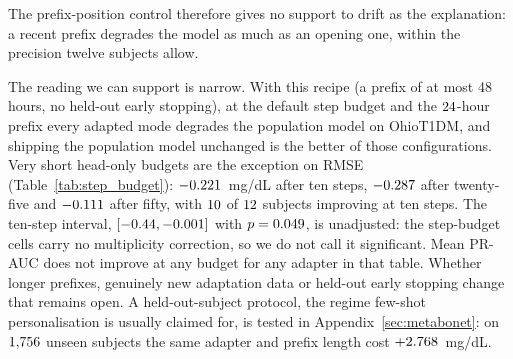 The prefix-position control therefore gives no support to drift as the
explanation: a recent prefix degrades the model as much as an opening one, within
the precision twelve subjects allow.

The reading we can support is narrow. With this recipe (a prefix of at most 48
hours, no held-out early stopping), at the default step budget and the
$24$-hour prefix every adapted mode degrades the population
model on OhioT1DM, and shipping the population model unchanged is the better of
those configurations. Very short head-only budgets are the exception on RMSE
(Table~\ref{tab:step_budget}): $-0.221$~mg/dL after ten steps,
$-0.287$ after twenty-five and
$-0.111$ after fifty, with $10$ of
$12$ subjects improving at ten steps. The ten-step interval,
$[-0.44, -0.001]$ with $p =
0.049$, is unadjusted: the step-budget cells carry no multiplicity
correction, so we do not call it significant. Mean PR-AUC does not improve at any
budget for any adapter in that table. Whether longer prefixes, genuinely new adaptation
data or held-out early stopping change that remains open. A held-out-subject
protocol, the regime few-shot personalisation is usually claimed for, is tested
in Appendix~\ref{sec:metabonet}: on $1{,}756$ unseen subjects the
same adapter and prefix length cost $+2.768$~mg/dL.

